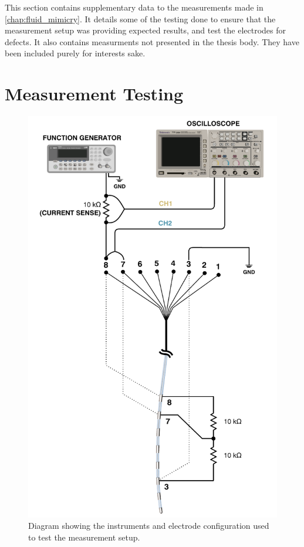 This section contains supplementary data to the measurements made in \cref{chap:fluid_mimicry}.
It details some of the testing done to ensure that the measurement setup was providing expected results, and test the electrodes for defects.
It also contains measurments not presented in the thesis body.
They have been included purely for interests sake.

\section{Measurement Testing}

\begin{figure}
    \centering
    \includegraphics[scale=0.95]{content/appendices/Solution-Impedance-Measurements/graphics/Solution-Impedance-Testing-Setup}
    \caption{\label{fig:solution_impedance_testing_setup}Diagram showing the instruments and electrode configuration used to test the measurement setup.}
\end{figure}

